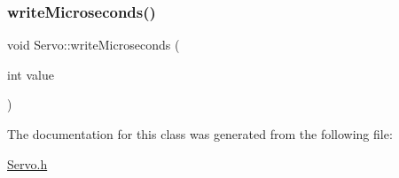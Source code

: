 \subsubsection{\texorpdfstring{write\+Microseconds()}{writeMicroseconds()}}
{\footnotesize\ttfamily void Servo\+::write\+Microseconds (\begin{DoxyParamCaption}\item[{int}]{value }\end{DoxyParamCaption})}



The documentation for this class was generated from the following file\+:\begin{DoxyCompactItemize}
\item 
\hyperlink{_servo_8h}{Servo.\+h}\end{DoxyCompactItemize}
